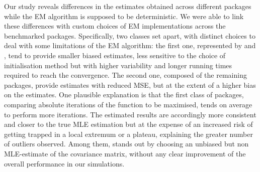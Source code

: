 Our study reveals differences in the estimates obtained across different packages while the EM algorithm is supposed to be deterministic. We were able to link these differences with custom choices of EM implementations across the benchmarked packages.
Specifically, two classes set apart, with distinct choices to deal with some limitations of the EM algorithm: the first
one, represented by  and , tend to provide
smaller biased estimates, less sensitive to the choice of initialisation
method but with higher variability and longer running times required to reach the convergence. The second one, composed of the remaining
packages, provide estimates with reduced MSE, but at the extent of a
higher bias on the estimates. One plausible explanation is that the first class of packages, comparing absolute iterations of the function to be maximised, tends on average to perform more iterations. The estimated results are accordingly more consistent and closer to the true MLE estimation but at the expense of an increased risk of getting trapped in a local extremum or a plateau, explaining the greater number of outliers observed. Among them,  stands out by choosing
an unbiased but non MLE-estimate of the covariance matrix, without any clear improvement
of the overall performance in our simulations.

